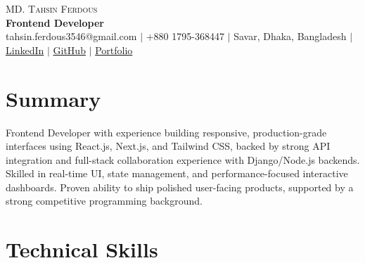 \documentclass[letterpaper,10.5pt]{article}
\begin{document}

\begin{center}
    {\LARGE \scshape MD. Tahsin Ferdous} \\ \vspace{4pt}
    {\large\bfseries Frontend Developer} \\ \vspace{6pt}
    \small
    tahsin.ferdous3546@gmail.com $|$
    +880 1795-368447 $|$
    Savar, Dhaka, Bangladesh $|$
    \href{https://www.linkedin.com/in/md-tahsin-ferdous/}{LinkedIn} $|$
    \href{https://github.com/Tahsin005}{GitHub} $|$
    \href{https://tahsin-exe.vercel.app/}{Portfolio}
\end{center}


\section{Summary}

\small{
Frontend Developer with experience building responsive, production-grade interfaces using {React.js, Next.js, and Tailwind CSS}, backed by strong API integration and full-stack collaboration experience with Django/Node.js backends. Skilled in real-time UI, state management, and performance-focused interactive dashboards. Proven ability to ship polished user-facing products, supported by a strong competitive programming background.
}


\section{Technical Skills}
\end{document}
